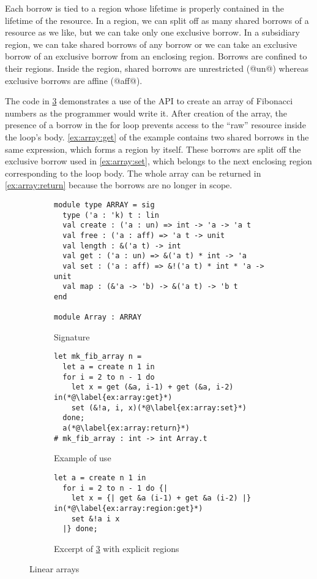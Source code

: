 Each borrow is tied to a region whose lifetime is properly
contained in the lifetime of the resource.
In a region, we can split off as many shared borrows of a resource as
we like, but we can take only one exclusive borrow. In a 
subsidiary region, we can take shared borrows of any
borrow or we can take an exclusive borrow of an exclusive borrow from an
enclosing region. Borrows are confined to their regions. Inside the region,
shared borrows are unrestricted (@un@) whereas exclusive
borrows are affine (@aff@).

The code in \cref{ex:array} demonstrates a use of the API to create an
array of Fibonacci numbers as the programmer would write it. After
creation of the array, the presence of a borrow in the for loop
prevents access to the ``raw'' resource inside the loop's
body. \cref{ex:array:get} of the example contains two shared borrows
in the same expression, which forms a region by itself. These borrows
are split off the exclusive borrow used in \cref{ex:array:set}, which
belongs to the next enclosing region corresponding to the loop body.
The whole array can be returned in \cref{ex:array:return} because  the
borrows are no longer in scope. 

\begin{figure}[tp]
  \centering
  \begin{subfigure}[t]{1\linewidth}
\begin{lstlisting}
module type ARRAY = sig
  type ('a : 'k) t : lin
  val create : ('a : un) => int -> 'a -> 'a t
  val free : ('a : aff) => 'a t -> unit
  val length : &('a t) -> int
  val get : ('a : un) => &('a t) * int -> 'a
  val set : ('a : aff) => &!('a t) * int * 'a -> unit
  val map : (&'a -> 'b) -> &('a t) -> 'b t
end

module Array : ARRAY
\end{lstlisting}
    \vspace{-15pt}
    \caption{Signature}
    \label{sig:array}
  \end{subfigure}

  \begin{subfigure}[t]{1\linewidth}
\begin{lstlisting}
let mk_fib_array n =
  let a = create n 1 in
  for i = 2 to n - 1 do
    let x = get (&a, i-1) + get (&a, i-2) in(*@\label{ex:array:get}*)
    set (&!a, i, x)(*@\label{ex:array:set}*)
  done;
  a(*@\label{ex:array:return}*)
# mk_fib_array : int -> int Array.t
\end{lstlisting}
    \vspace{-10pt}
    \caption{Example of use}
    \label{ex:array}
\begin{lstlisting}[firstnumber=2]
  let a = create n 1 in
  for i = 2 to n - 1 do {|
    let x = {| get &a (i-1) + get &a (i-2) |} in(*@\label{ex:array:region:get}*)
    set &!a i x
  |} done;
\end{lstlisting}
    \vspace{-10pt}
    \caption{Excerpt of \cref{ex:array} with explicit regions}
    \label{ex:array:region}
  \end{subfigure}
  \vspace{-5pt}
  \caption{Linear arrays}
  \label{ex:array}
\end{figure}

